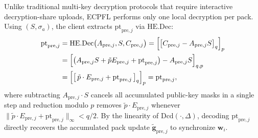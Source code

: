 Unlike traditional multi-key decryption protocols that require interactive decryption-share uploads, \textsc{ECPFL} performs only one local decryption per pack. Using $(S, \sigma_a)$, the client extracts $\mathrm{pt}_{\mathrm{pre},j}$ via $\mathrm{HE.Dec}$:
\begin{align}
 \mathrm{pt}_{\mathrm{pre},j}
 &= \mathrm{HE.Dec}\bigl(A_{\mathrm{pre},j}, S, C_{\mathrm{pre},j}\bigr) = \Bigl[\bigl[ C_{\mathrm{pre},j} - A_{\mathrm{pre},j} S \bigr]_{q}\Bigr]_{p} \notag \\
 &= \Bigl[\bigl(A_{\mathrm{pre},j} S + \tilde{p} E_{\mathrm{pre},j} + \mathrm{pt}_{\mathrm{pre},j}\bigr) - A_{\mathrm{pre},j} S\Bigr]_{q,p} \notag \\
 &= \Bigl[\bigl[\, \tilde{p} \cdot E_{\mathrm{pre},j} + \mathrm{pt}_{\mathrm{pre},j} \,\bigr]_{q}\Bigr]_p = \mathrm{pt}_{\mathrm{pre},j},
\label{eq:one-shot-dec}
\end{align}
where subtracting $A_{\mathrm{pre},j} \cdot S$ cancels all accumulated public-key masks in a single step and reduction modulo $p$ removes $\tilde{p} \cdot E_{\mathrm{pre},j}$ whenever $\|\tilde{p} \cdot E_{\mathrm{pre},j} + \mathrm{pt}_{\mathrm{pre},j}\|_\infty < q/2$. By the linearity of $\mathrm{Dcd}(\cdot, \Delta)$, decoding $\mathrm{pt}_{\mathrm{pre},j}$ directly recovers the accumulated pack update $\tilde{\mathbf{g}}_{\mathrm{pre},j}$ to synchronize $\mathbf{w}_i$.

